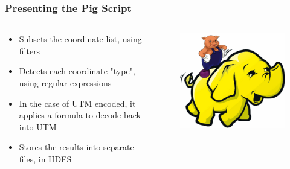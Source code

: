 \documentclass[hyperref={pdfpagelabels=true}]{beamer}
\begin{document}
\begin{frame}
\frametitle{Presenting the Pig Script}
\begin{columns}
  \begin{column}{0.5\textwidth}
    \begin{itemize}
      \item<1->Subsets the coordinate list, using filters
      \item<1->Detects each coordinate "type", using regular expressions
      \item<1->In the case of UTM encoded, it applies a formula to decode back into UTM
      \item<1->Stores the results into separate files, in HDFS  
    \end{itemize}
  \end{column}  
  \begin{column}{0.5\textwidth}
      \begin{figure}  
	\includegraphics[width=\textwidth]{pig-on-elephant.png}
       \end{figure}  
  \end{column}  
\end{columns}
\end{frame}
\end{document}
